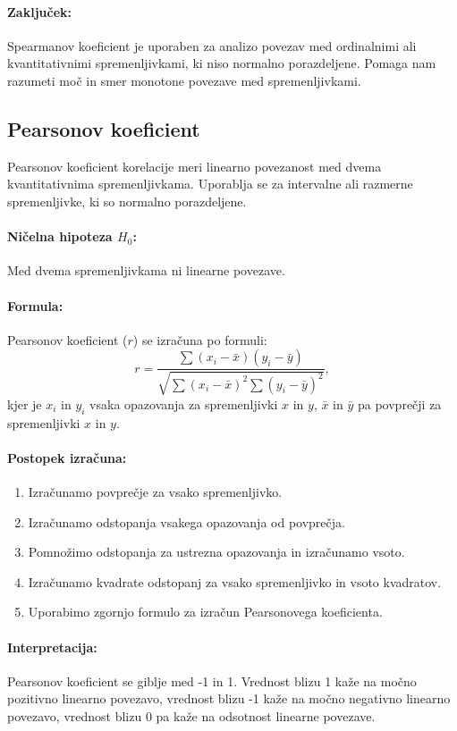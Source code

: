 \paragraph{Zaključek:}
Spearmanov koeficient je uporaben za analizo povezav med ordinalnimi ali kvantitativnimi spremenljivkami, ki niso normalno porazdeljene. Pomaga nam razumeti moč in smer monotone povezave med spremenljivkami.

\subsection{Pearsonov koeficient}

Pearsonov koeficient korelacije meri linearno povezanost med dvema kvantitativnima spremenljivkama. Uporablja se za intervalne ali razmerne spremenljivke, ki so normalno porazdeljene.

\paragraph{Ničelna hipoteza $H_0$:}
Med dvema spremenljivkama ni linearne povezave.

\paragraph{Formula:}
Pearsonov koeficient ($r$) se izračuna po formuli:
\[r = \frac{\sum (x_i - \bar{x})(y_i - \bar{y})}{\sqrt{\sum (x_i - \bar{x})^2 \sum (y_i - \bar{y})^2}},\]
kjer je $x_i$ in $y_i$ vsaka opazovanja za spremenljivki $x$ in $y$, $\bar{x}$ in $\bar{y}$ pa povprečji za spremenljivki $x$ in $y$.

\paragraph{Postopek izračuna:}
\begin{enumerate}
    \item Izračunamo povprečje za vsako spremenljivko.
    \item Izračunamo odstopanja vsakega opazovanja od povprečja.
    \item Pomnožimo odstopanja za ustrezna opazovanja in izračunamo vsoto.
    \item Izračunamo kvadrate odstopanj za vsako spremenljivko in vsoto kvadratov.
    \item Uporabimo zgornjo formulo za izračun Pearsonovega koeficienta.
\end{enumerate}

\paragraph{Interpretacija:}
Pearsonov koeficient se giblje med -1 in 1. Vrednost blizu 1 kaže na močno pozitivno linearno povezavo, vrednost blizu -1 kaže na močno negativno linearno povezavo, vrednost blizu 0 pa kaže na odsotnost linearne povezave.

